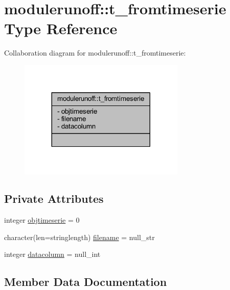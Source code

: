\hypertarget{structmodulerunoff_1_1t__fromtimeserie}{}\section{modulerunoff\+:\+:t\+\_\+fromtimeserie Type Reference}
\label{structmodulerunoff_1_1t__fromtimeserie}


Collaboration diagram for modulerunoff\+:\+:t\+\_\+fromtimeserie\+:\nopagebreak
\begin{figure}[H]
\begin{center}
\leavevmode
\includegraphics[width=224pt]{structmodulerunoff_1_1t__fromtimeserie__coll__graph}
\end{center}
\end{figure}
\subsection*{Private Attributes}
\begin{DoxyCompactItemize}
\item 
integer \mbox{\hyperlink{structmodulerunoff_1_1t__fromtimeserie_ad88a24c8e7435455578414b01837576c}{objtimeserie}} = 0
\item 
character(len=stringlength) \mbox{\hyperlink{structmodulerunoff_1_1t__fromtimeserie_aecdb0da7adab0730fd09213e9c3f89ba}{filename}} = null\+\_\+str
\item 
integer \mbox{\hyperlink{structmodulerunoff_1_1t__fromtimeserie_a11f8cafd13ed8b1b5cfedc75f80a44e8}{datacolumn}} = null\+\_\+int
\end{DoxyCompactItemize}


\subsection{Member Data Documentation}
\mbox{\label{structmodulerunoff_1_1t__fromtimeserie_a11f8cafd13ed8b1b5cfedc75f80a44e8}} 
